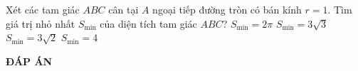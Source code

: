 \begin{ex}%
Xét các tam giác $ABC$ cân tại $A$ ngoại tiếp đường tròn có bán kính $r=1$. Tìm giá trị nhỏ nhất $S_{\min}$ của diện tích tam giác $ABC$?
\choice
{$S_{\min} = 2\pi$}
{\True $S_{\min} = 3\sqrt{3}$}
{$S_{\min} = 3\sqrt{2}$}
{$S_{\min} = 4$}
\end{ex}


\newpage
\begin{center}
\textbf{ĐÁP ÁN}
\end{center}
\begin{multicols}{10}

\end{multicols}


